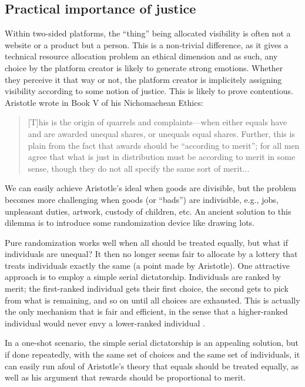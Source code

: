 \documentclass[prodmode,acmec]{acmsmall}
\begin{document}
\subsection{Practical importance of justice}
Within two-sided platforms, the ``thing'' being allocated visibility
is often not a website or a product but a person.  This is a
non-trivial difference, as it gives a technical resource allocation
problem an ethical dimension and as such, any choice by the platform
creator is likely to generate strong emotions. Whether they perceive
it that way or not, the platform creator is implicitely assigning
visibility according to some notion of justice. This is likely to
prove contentious. Aristotle wrote in Book V of his Nichomachean
Ethics:
\begin{quote}
  [T]his is the origin of quarrels and complaints---when either equals
  have and are awarded unequal shares, or unequals equal
  shares. Further, this is plain from the fact that awards should be
  ``according to merit''; for all men agree that what is just in
  distribution must be according to merit in some sense, though they
  do not all specify the same sort of merit...
\end{quote} 
We can easily achieve Aristotle's ideal when goods are divisible, but
the problem becomes more challenging when goods (or ``bads'') are
indivisible, e.g., jobs, unpleasant duties, artwork, custody of
children, etc. An ancient solution to this dilemma is to introduce some
randomization device like drawing lots.

Pure randomization works well when all should be treated equally, but
what if individuals are unequal? It then no longer seems fair to
allocate by a lottery that treats individuals exactly the same (a
point made by Aristotle). One attractive approach is to employ a
simple serial dictatorship. Individuals are ranked by merit; the
first-ranked individual gets their first choice, the second gets to
pick from what is remaining, and so on until all choices are
exhausted. This is actually the only mechanism that is fair and
efficient, in the sense that a higher-ranked individual would never
envy a lower-ranked individual \cite{balinski1999tale}.

In a one-shot scenario, the simple serial dictatorship is an appealing
solution, but if done repeatedly, with the same set of choices and the
same set of individuals, it can easily run afoul of Aristotle's theory
that equals should be treated equally, as well as his argument that
rewards should be proportional to merit.
\end{document}
